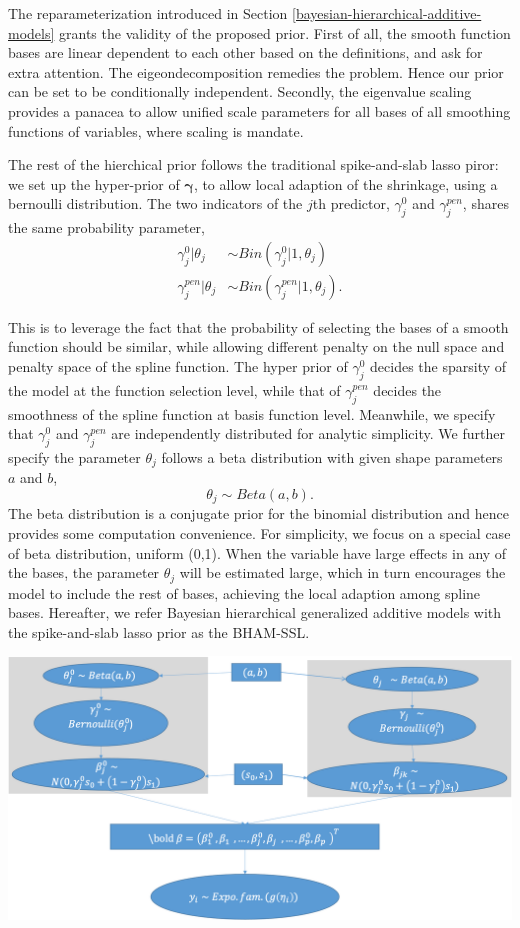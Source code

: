 \documentclass[AMA,STIX1COL,]{WileyNJD-v2}
\begin{document}
The reparameterization introduced in Section
\ref{bayesian-hierarchical-additive-models} grants the validity of the
proposed prior. First of all, the smooth function bases are linear
dependent to each other based on the definitions, and ask for extra
attention. The eigeondecomposition remedies the problem. Hence our prior
can be set to be conditionally independent. Secondly, the eigenvalue
scaling provides a panacea to allow unified scale parameters for all
bases of all smoothing functions of variables, where scaling is mandate.

The rest of the hierchical prior follows the traditional spike-and-slab
lasso piror: we set up the hyper-prior of \(\boldsymbol{\gamma}\), to
allow local adaption of the shrinkage, using a bernoulli distribution.
The two indicators of the \(j\)th predictor, \(\gamma^{0}_j\) and
\(\gamma^{pen}_j\), shares the same probability parameter, \[
\begin{aligned}
\gamma_{j}^{0} | \theta_j &\sim Bin(\gamma^{0}_{j}|1, \theta_j)\\
\gamma_{j}^{pen} | \theta_j &\sim Bin(\gamma^{pen}_{j}|1, \theta_j).
\end{aligned}
\]

This is to leverage the fact that the probability of selecting the bases
of a smooth function should be similar, while allowing different penalty
on the null space and penalty space of the spline function. The hyper
prior of \(\gamma_{j}^{0}\) decides the sparsity of the model at the
function selection level, while that of \(\gamma_{j}^{pen}\) decides the
smoothness of the spline function at basis function level. Meanwhile, we
specify that \(\gamma_{j}^0\) and \(\gamma_{j}^{pen}\) are independently
distributed for analytic simplicity. We further specify the parameter
\(\theta_j\) follows a beta distribution with given shape parameters
\(a\) and \(b\), \[
\theta_j \sim Beta(a, b).
\] The beta distribution is a conjugate prior for the binomial
distribution and hence provides some computation convenience. For
simplicity, we focus on a special case of beta distribution, uniform
(0,1). When the variable have large effects in any of the bases, the
parameter \(\theta_j\) will be estimated large, which in turn encourages
the model to include the rest of bases, achieving the local adaption
among spline bases. Hereafter, we refer Bayesian hierarchical
generalized additive models with the spike-and-slab lasso prior as the
BHAM-SSL.

\newpage

\includegraphics{Fig/SS_prior_flow_chart.png}
\end{document}
